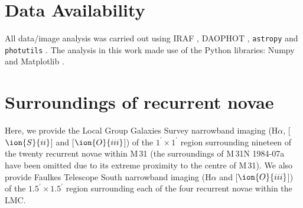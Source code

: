\documentclass[fleqn,usenatbib]{mnras}
\begin{document}
\section*{Data Availability}
All data/image analysis was carried out using IRAF \citep{1986SPIE..627..733T,1993ASPC...52..173T}, DAOPHOT \citep{1987PASP...99..191S}, {\tt astropy} \citep[v4.0;][]{2018AJ....156..123T} and {\tt photutils} \citep[v0.7.2;][]{larry_bradley_2019_3568287}. The analysis in this work made use of the Python libraries: Numpy \citep{harris2020array} and Matplotlib \citep{Hunter:2007}.




\appendix

\section{Surroundings of recurrent novae}
Here, we provide the Local Group Galaxies Survey \citep[LGGS;][]{2007AJ....134.2474M} narrowband imaging (H$\alpha$, [$\ion{S}{ii}$] and [$\ion{O}{iii}$]) of the $1^\prime\times1^\prime$ region surrounding nineteen of the twenty recurrent novae within M\,31 (the surroundings of M\,31N 1984-07a have been omitted due to its extreme proximity to the centre of M\,31). We also provide Faulkes Telescope South narrowband imaging (H$\alpha$ and [$\ion{O}{iii}$]) of the $1.5^\prime\times1.5^\prime$ region surrounding each of the four recurrent novae within the LMC.



\bsp
\label{lastpage}
\end{document}
